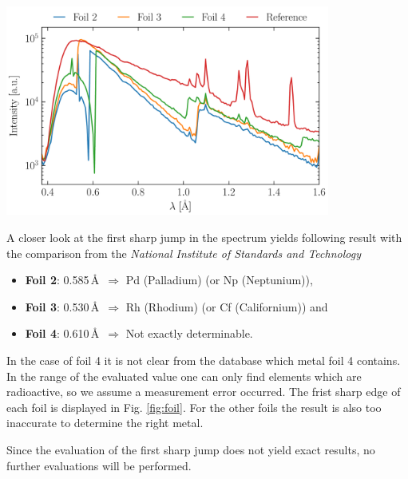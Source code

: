 \begin{center}
    \captionsetup{type = figure}
    \includegraphics[width = 0.8\textwidth]{Pictures/Evaluation/41/XRay-Spectrum.pdf}
    \label{fig:xRay}
\end{center}

A closer look at the first sharp jump in the spectrum yields following result with the comparison from the \textit{National Institute of Standards and Technology}\cite{XRayDatabase}
\begin{itemize}
    \item \textbf{Foil 2}: 0.585\,\AA~$\Rightarrow$ Pd (Palladium) (or Np (Neptunium)),
    \item \textbf{Foil 3}: 0.530\,\AA~$\Rightarrow$ Rh (Rhodium) (or Cf (Californium)) and
    \item \textbf{Foil 4}: 0.610\,\AA~$\Rightarrow$ Not exactly determinable.
\end{itemize}
In the case of foil 4 it is not clear from the database which metal foil 4 contains. In the range of the evaluated value one can only find elements which are radioactive, so we assume a measurement error occurred. The frist sharp edge of each foil is displayed in Fig. \ref{fig:foil}. For the other foils the result is also too inaccurate to determine the right metal. 
\bigskip

Since the evaluation of the first sharp jump does not yield exact results, no further evaluations will be performed.

